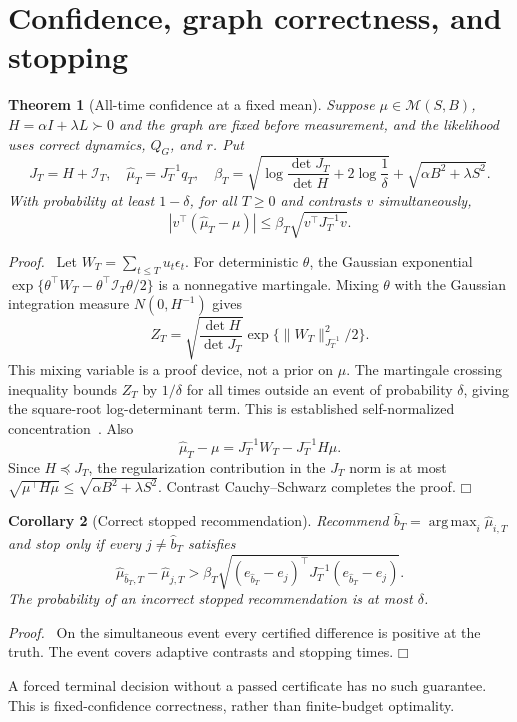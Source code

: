 \documentclass[11pt]{article}
\newtheorem{theorem}{Theorem}
\newtheorem{corollary}[theorem]{Corollary}
\newenvironment{proof}{\par\noindent\textit{Proof.}\ }{\hfill$\mdlgwhtsquare$\par\medskip}
\newcommand{\argmax}{\operatorname*{arg\,max}}
\begin{document}
\section{Confidence, graph correctness, and stopping}
\begin{theorem}[All-time confidence at a fixed mean]
Suppose $\mu\in\mathcal M(S,B)$, $H=\alpha I+\lambda L\succ0$ and the graph are fixed before measurement, and the likelihood uses correct dynamics, $Q_G$, and $r$. Put
\begin{equation}
J_T=H+\mathcal I_T,\quad\widehat\mu_T=J_T^{-1}q_T,\quad
\beta_T=\sqrt{\log\frac{\det J_T}{\det H}+2\log\frac1\delta}
+\sqrt{\alpha B^2+\lambda S^2}.
\label{eq:beta}
\end{equation}
With probability at least $1-\delta$, for all $T\ge0$ and contrasts $v$ simultaneously,
\begin{equation}
\boxed{|v^\top(\widehat\mu_T-\mu)|\le\beta_T\sqrt{v^\top J_T^{-1}v}.}
\label{eq:confidence}
\end{equation}
\end{theorem}
\begin{proof}
Let $W_T=\sum_{t\le T}u_t\epsilon_t$. For deterministic $\theta$, the Gaussian exponential
$\exp\{\theta^\top W_T-\theta^\top\mathcal I_T\theta/2\}$ is a nonnegative martingale. Mixing $\theta$ with the Gaussian integration measure $N(0,H^{-1})$ gives
\[
Z_T=\sqrt{\frac{\det H}{\det J_T}}\exp\{\|W_T\|_{J_T^{-1}}^2/2\}.
\]
This mixing variable is a proof device, not a prior on $\mu$. The martingale crossing inequality bounds $Z_T$ by $1/\delta$ for all times outside an event of probability $\delta$, giving the square-root log-determinant term. This is established self-normalized concentration~\cite{abbasi2011}. Also
\[
\widehat\mu_T-\mu=J_T^{-1}W_T-J_T^{-1}H\mu.
\]
Since $H\preceq J_T$, the regularization contribution in the $J_T$ norm is at most $\sqrt{\mu^\top H\mu}\le\sqrt{\alpha B^2+\lambda S^2}$. Contrast Cauchy--Schwarz completes the proof.
\end{proof}

\begin{corollary}[Correct stopped recommendation]
Recommend $\widehat b_T=\argmax_i\widehat\mu_{i,T}$ and stop only if every $j\ne\widehat b_T$ satisfies
\begin{equation}
\widehat\mu_{\widehat b_T,T}-\widehat\mu_{j,T}>
\beta_T\sqrt{(e_{\widehat b_T}-e_j)^\top J_T^{-1}(e_{\widehat b_T}-e_j)}.
\label{eq:stopping}
\end{equation}
The probability of an incorrect stopped recommendation is at most $\delta$.
\end{corollary}
\begin{proof}
On the simultaneous event every certified difference is positive at the truth. The event covers adaptive contrasts and stopping times.
\end{proof}
A forced terminal decision without a passed certificate has no such guarantee. This is fixed-confidence correctness, rather than finite-budget optimality.
\end{document}
